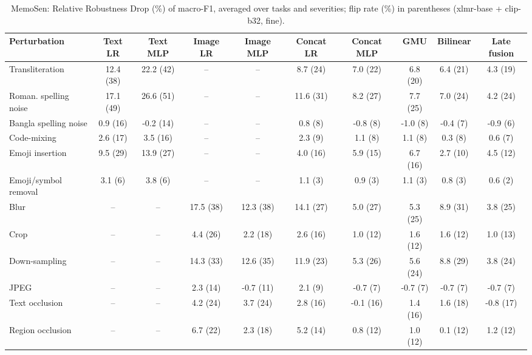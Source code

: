 \begin{table}[t]
\centering
\small
\caption{MemoSen: Relative Robustness Drop (\%) of macro-F1, averaged over tasks and severities; flip rate (\%) in parentheses (xlmr-base + clip-b32, fine).}
\label{tab:rob_fine_memosen}
\begin{adjustbox}{max width=\textwidth}
\begin{tabular}{lccccccccc}
\toprule
Perturbation & Text LR & Text MLP & Image LR & Image MLP & Concat LR & Concat MLP & GMU & Bilinear & Late fusion \\
\midrule
Transliteration & 12.4 (38) & 22.2 (42) & -- & -- & 8.7 (24) & 7.0 (22) & 6.8 (20) & 6.4 (21) & 4.3 (19) \\
Roman. spelling noise & 17.1 (49) & 26.6 (51) & -- & -- & 11.6 (31) & 8.2 (27) & 7.7 (25) & 7.0 (24) & 4.2 (24) \\
Bangla spelling noise & 0.9 (16) & -0.2 (14) & -- & -- & 0.8 (8) & -0.8 (8) & -1.0 (8) & -0.4 (7) & -0.9 (6) \\
Code-mixing & 2.6 (17) & 3.5 (16) & -- & -- & 2.3 (9) & 1.1 (8) & 1.1 (8) & 0.3 (8) & 0.6 (7) \\
Emoji insertion & 9.5 (29) & 13.9 (27) & -- & -- & 4.0 (16) & 5.9 (15) & 6.7 (16) & 2.7 (10) & 4.5 (12) \\
Emoji/symbol removal & 3.1 (6) & 3.8 (6) & -- & -- & 1.1 (3) & 0.9 (3) & 1.1 (3) & 0.8 (3) & 0.6 (2) \\
Blur & -- & -- & 17.5 (38) & 12.3 (38) & 14.1 (27) & 5.0 (27) & 5.3 (25) & 8.9 (31) & 3.8 (25) \\
Crop & -- & -- & 4.4 (26) & 2.2 (18) & 2.6 (16) & 1.0 (12) & 1.6 (12) & 1.6 (12) & 1.0 (13) \\
Down-sampling & -- & -- & 14.3 (33) & 12.6 (35) & 11.9 (23) & 5.3 (26) & 5.6 (24) & 8.8 (29) & 3.8 (24) \\
JPEG & -- & -- & 2.3 (14) & -0.7 (11) & 2.1 (9) & -0.7 (7) & -0.7 (7) & -0.7 (7) & -0.7 (7) \\
Text occlusion & -- & -- & 4.2 (24) & 3.7 (24) & 2.8 (16) & -0.1 (16) & 1.4 (16) & 1.6 (18) & -0.8 (17) \\
Region occlusion & -- & -- & 6.7 (22) & 2.3 (18) & 5.2 (14) & 0.8 (12) & 1.0 (12) & 0.1 (12) & 1.2 (12) \\
\bottomrule
\end{tabular}
\end{adjustbox}
\end{table}
